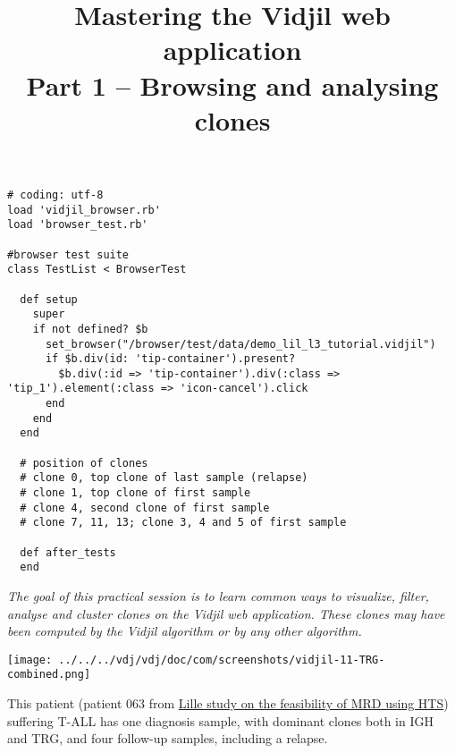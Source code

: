 \documentclass[11pt]{article}
\title{Mastering the Vidjil web application \\[1ex] Part 1 --
  Browsing and analysing clones
}
\begin{document}
\begin{verbatim}
# coding: utf-8
load 'vidjil_browser.rb'
load 'browser_test.rb'

#browser test suite
class TestList < BrowserTest

  def setup
    super
    if not defined? $b
      set_browser("/browser/test/data/demo_lil_l3_tutorial.vidjil")
      if $b.div(id: 'tip-container').present?
        $b.div(:id => 'tip-container').div(:class => 'tip_1').element(:class => 'icon-cancel').click
      end
    end
  end

  # position of clones
  # clone 0, top clone of last sample (relapse)
  # clone 1, top clone of first sample
  # clone 4, second clone of first sample
  # clone 7, 11, 13; clone 3, 4 and 5 of first sample

  def after_tests
  end
\end{verbatim}


\maketitle

\textit{The goal of this practical session is to learn
common ways to visualize, filter, analyse and cluster clones
on the Vidjil web application.
%
These clones may have been computed by the Vidjil algorithm
or by any other algorithm.}

\bigskip


\centerline{\texttt{[image: ../../../vdj/vdj/doc/com/screenshots/vidjil-11-TRG-combined.png]}}

\bigskip



This patient (patient 063 from \href{http://dx.doi.org/10.1016/j.leukres.2016.11com.009}{Lille study on the feasibility of MRD using HTS}) suffering T-ALL has one diagnosis sample,
with dominant clones both in IGH and TRG,
and four follow-up samples, including a relapse.

\end{document}
